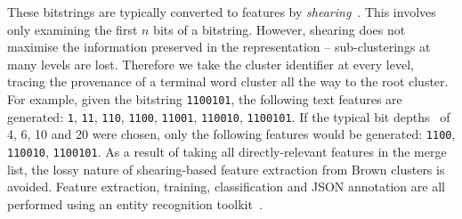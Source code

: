 \documentclass[sigconf,anonymous,review]{acmart}
\begin{document}
These bitstrings are typically converted to features by \emph{shearing}~\cite{derczynski2016generalised}.
This involves only examining the first $n$ bits of a bitstring.
However, shearing does not maximise the information preserved in the representation -- sub-clusterings at many levels are lost.
Therefore we take the cluster identifier at every level, tracing the provenance of a terminal word cluster all the way to the root cluster.
For example, given the bitstring {\tt 1100101}, the following text features are generated: {\tt 1}, {\tt 11}, {\tt 110}, {\tt 1100}, {\tt 11001}, {\tt 110010}, {\tt 1100101}.
If the typical bit depths~\cite{ratinov2009design} of 4, 6, 10 and 20 were chosen, only the following features would be generated: {\tt 1100}, {\tt 110010}, {\tt 1100101}.
As a result of taking all directly-relevant features in the merge list, the lossy nature of shearing-based feature extraction from Brown clusters is avoided.
Feature extraction, training, classification and JSON annotation are all performed using an entity recognition toolkit~\cite{derczynski2015usfd}.%
\end{document}
